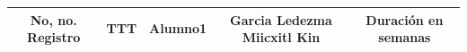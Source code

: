 \begin{table}[]
\begin{tabular}{ccc|c|cccllcllllllllllllll|}
\multirow{-3}{*}{No, no. Registro}                & \multicolumn{2}{c|}{\multirow{-3}{*}{TTT}}                                                                                                                                                                                                                                                                                  & \multirow{-2}{*}{Alumno1}                                                                                                                                                                                                                                                                                                                                   & \multicolumn{2}{c|}{\multirow{-2}{*}{Garcia Ledezma Miicxitl Kin}}                                                                                                                                                                                                                                                                                       & \multicolumn{18}{c|}{Duración en semanas}                                                                                                                                                                                                                                                                                                                                                                                                                                                                                                                                   \\ \hline

\end{tabular}
\end{table}
